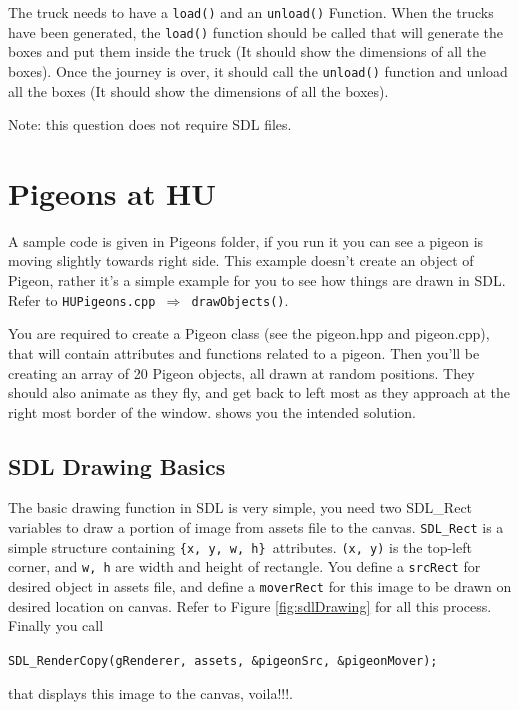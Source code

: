 \documentclass[a4paper,12pt]{article}
\begin{document}
	\noindent The truck needs to have a \texttt{load()} and an \texttt{unload()} Function. When the trucks have been generated, the \texttt{load()} function should be called that will generate the boxes and put them inside the truck (It should show the dimensions of all the boxes). Once the journey is over, it should call the \texttt{unload()} function and unload all the boxes (It should show the dimensions of all the boxes).
	
	Note: this question does not require SDL files.
	
	\section{Pigeons at HU}
	
	A sample code is given in Pigeons folder, if you run it you can see a pigeon is moving slightly towards right side. This example doesn't create an object of Pigeon, rather it's a simple example for you to see how things are drawn in SDL. Refer to \texttt{HUPigeons.cpp $ \Rightarrow $ drawObjects()}.
	
	 You are required to create a Pigeon class (see the pigeon.hpp and pigeon.cpp), that will contain attributes and functions related to a pigeon. Then you'll be creating an array of 20 Pigeon objects, all drawn at random positions. They should also animate as they fly, and get back to left most as they approach at the right most border of the window.  shows you the intended solution.
	
	
	\subsection{SDL Drawing Basics}
	
	The basic drawing function in SDL is very simple, you need two SDL\_Rect variables to draw a portion of image from assets file to the canvas. \texttt{SDL\_Rect} is a simple structure containing \texttt{\{x, y, w, h\} }attributes. \texttt{(x, y)} is the top-left corner, and \texttt{w, h} are width and height of rectangle. You define a \texttt{srcRect} for desired object in assets file, and define a \texttt{moverRect} for this image to be drawn on desired location on canvas. Refer to Figure \ref{fig:sdlDrawing} for all this process.  Finally you call 
	
	\noindent \texttt{SDL\_RenderCopy(gRenderer, assets, \&pigeonSrc, \&pigeonMover);}
	
	\noindent that displays this image to the canvas, voila!!!. 
	
\end{document}
